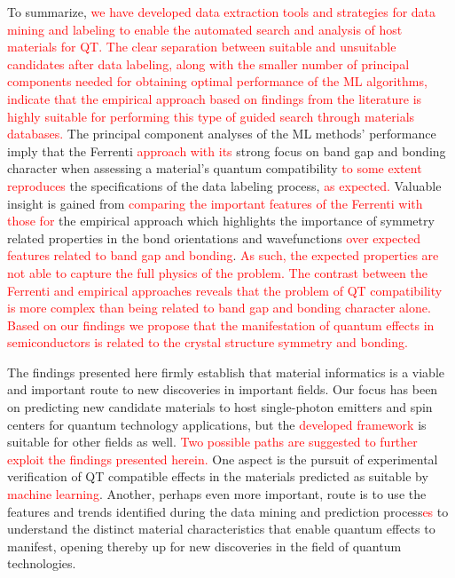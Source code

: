 \documentclass[superscriptaddress,unsortedaddress,
 amsmath,amssymb,
 aps,
]{revtex4-2}
\newcommand{\mrk}[1]{\textcolor{red}{#1}}
\begin{document}
To summarize, \mrk{we have developed data extraction tools and strategies for data mining and labeling to enable the automated search and analysis of host materials for QT.} 
\mrk{The clear separation between suitable and unsuitable candidates after data labeling, along with the smaller number of principal components needed for obtaining optimal performance of the ML algorithms, indicate that the empirical approach based on findings from the literature is highly suitable for performing this type of guided search through materials databases.} 
The principal component analyses of the ML methods' performance imply that the Ferrenti \mrk{approach with its} strong focus on band gap and bonding character when assessing a material's quantum compatibility \mrk{to some extent reproduces} the specifications of the data labeling process, \mrk{as expected.} 
Valuable insight is gained from \mrk{comparing the important features of the Ferrenti with those for} the empirical approach which highlights the importance of symmetry related properties in the bond orientations and wavefunctions \mrk{over expected features related to band gap and bonding}. \mrk{As such, the expected properties are not able to capture the full physics of the problem. The contrast between the Ferrenti and empirical approaches reveals that the problem of QT compatibility is more complex than being related to band gap and bonding character alone. Based on our findings we propose that the manifestation of quantum effects in semiconductors is related to the crystal structure symmetry and bonding. }


The findings presented here firmly establish that material informatics is a viable and important route to new discoveries in important fields. 
Our focus has been on predicting new candidate materials to host single-photon emitters and spin centers for quantum technology applications, but the \mrk{developed framework} is suitable for other fields as well. \mrk{Two possible paths are suggested to further exploit the findings presented herein.} One aspect is the pursuit of experimental verification of QT compatible effects in the materials predicted as suitable by \mrk{machine learning}. Another, perhaps even more important, route is to use the features and trends identified during the data mining and prediction process\mrk{es} to understand the distinct material characteristics that enable quantum effects to manifest, opening  thereby up for new discoveries in the field of quantum technologies. 
\end{document}
